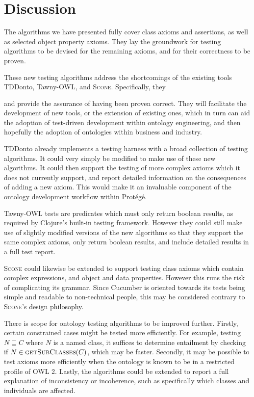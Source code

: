 \documentclass[paper.tex]{subfiles}
\begin{document}
\section{Discussion}
\label{sec:discussion}

The algorithms we have presented fully cover class axioms and assertions, as well as selected object property axioms.
They lay the groundwork for testing algorithms to be devised for the remaining axioms, and for their correctness to be proven.

These new testing algorithms address the shortcomings of the existing tools TDDonto, Tawny-OWL, and \textsc{Scone}.  Specifically, they

and provide the assurance of having been proven correct.
They will facilitate the development of new tools, or the extension of existing ones, which in turn can aid the adoption of test-driven development within ontology engineering, and then hopefully the adoption of ontologies within business and industry.

TDDonto already implements a testing harness with a broad collection of testing algorithms.
It could very simply be modified to make use of these new algorithms.
It could then support the testing of more complex axioms which it does not currently support, and report detailed information on the consequences of adding a new axiom.
This would make it an invaluable component of the ontology development workflow within Prot\'eg\'e.

Tawny-OWL tests are predicates which must only return boolean results, as required by Clojure's built-in testing framework.  \todo[dedup]
However they could still make use of slightly modified versions of the new algorithms so that they support the same complex axioms, only return boolean results, and include detailed results in a full test report.

\textsc{Scone} could likewise be extended to support testing class axioms which contain complex expressions, and object and data properties.
However this runs the risk of complicating its grammar.
Since Cucumber is oriented towards its tests being simple and readable to non-technical people, this may be considered contrary to \textsc{Scone}'s design philosophy.  

There is scope for ontology testing algorithms to be improved further.
Firstly, certain constrained cases might be tested more efficiently.
For example, testing $N \sqsubseteq C$ where $N$ is a named class, it suffices to determine entailment by checking if $N \in \Call{getSubClasses}{C}$, which may be faster.
Secondly, it may be possible to test axioms more efficiently when the ontology is known to be in a restricted profile of OWL 2.
Lastly, the algorithms could be extended to report a full explanation of inconsistency or incoherence, such as specifically which classes and individuals are affected.  
\end{document}

